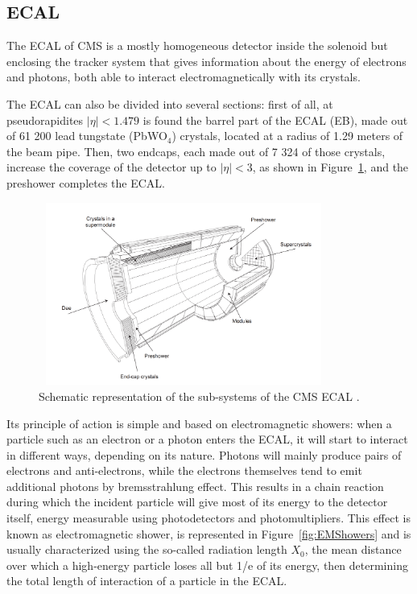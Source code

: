 \documentclass[a4paper, 10pt, openright]{report}
\begin{document}
\subsection{\acf{ECAL}} \label{subsection:ECAL}

The \ac{ECAL} of CMS is a mostly homogeneous detector inside the solenoid but enclosing the tracker system that gives information about the energy of electrons and photons, both able to interact electromagnetically with its crystals.

The \ac{ECAL} can also be divided into several sections: first of all, at pseudorapidites $|\eta| < 1.479$ is found the barrel part of the \ac{ECAL} (EB), made out of 61 200 lead tungstate (PbWO$_4$) crystals, located at a radius of 1.29 meters of the beam pipe. Then, two endcaps, each made out of 7 324 of those crystals, increase the coverage of the detector up to $|\eta| < 3$, as shown in Figure~\ref{fig:CMSECAL}, and the preshower completes the \ac{ECAL}.

\begin{figure}[htbp]
\begin{center}
\includegraphics[width=9.5cm, height=6cm]{figs/CMSEcal.png}
\caption{Schematic representation of the sub-systems of the \ac{CMS} \ac{ECAL} \cite{CMSDescription}.}
\label{fig:CMSECAL}
\end{center}
\end{figure}

Its principle of action is simple and based on electromagnetic showers: when a particle such as an electron or a photon enters the \ac{ECAL}, it will start to interact in different ways, depending on its nature. Photons will mainly produce pairs of electrons and anti-electrons, while the electrons themselves tend to emit additional photons by bremsstrahlung effect. This results in a chain reaction during which the incident particle will give most of its energy to the detector itself, energy measurable using photodetectors and photomultipliers. This effect is known as electromagnetic shower, is represented in Figure~\ref{fig:EMShowers} and is usually characterized using the so-called radiation length $X_0$, the mean distance over which a high-energy particle loses all but 1/e of its energy, then determining the total length of interaction of a particle in the \ac{ECAL}. 
\end{document}
